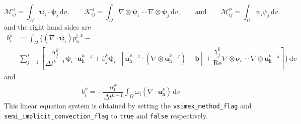 \documentclass[]{scrartcl}
\renewcommand{\d}{\,\mathrm{d}}
\newcommand{\bs}[1]{\boldsymbol{#1}}
\newcommand{\cdott}{\, {\cdot}{\cdot}\,}
\begin{document}
\begin{equation*}
	\mathcal{M}^u_{ij}= \int_{\Omega} \bs{\psi}_i \cdot \bs{\psi}_j \d v,
	\qquad
	\mathcal{K}^u_{ij} = \int_{\Omega} \nabla \otimes \bs{\psi}_i \cdott \nabla \otimes \bs{\psi}_j \d v,
	\qquad \textrm{and} \qquad
	\mathcal{M}^\phi_{ij} = \int_{\Omega} \psi_i \psi_j \d v.
\end{equation*}
and the right hand sides are 
\begin{equation*}
\begin{split}
	b^u_i &= \int_{\Omega}
\Bigg\lbrace
(\nabla \cdot \bs{\psi}_i) p^{\sharp, k}_\textrm{h}
- \\
&\sum_{j=1}^{s} 
\left[
\dfrac{\alpha_j^k}{\Delta t^{k-1}} \bs{\psi}_i \cdot \bs{u}^{k-j}_\textrm{h}
+
\beta_j^k \bs{\psi}_i \cdot \left[ \bs{u}^{k-j}_\textrm{h} \cdot (\nabla \otimes \bs{u}^{k-j}_\textrm{h} ) - \bs{b} \right]
+
\dfrac{\gamma_j^k}{\textrm{Re}} \nabla \otimes \bs{\nu}_i \cdott \nabla \otimes \bs{u}^{k-j}_\textrm{h}
\right]\Bigg\rbrace
\d v
\end{split}
\end{equation*}
and
\begin{equation*}
\begin{aligned}
b^\phi_i  = 	- \dfrac{\alpha_0^k}{\Delta t^{k-1}} 
\int_{\Omega}
\omega_i (\nabla \cdot \bs{u}^k_\textrm{h})
\d v
\end{aligned}
\end{equation*}
This linear equation system is obtained by setting the \texttt{vsimex\_method\_flag} and \\ \texttt{semi\_implicit\_convection\_flag} to \texttt{true} and \texttt{false} respectively.
\end{document}
